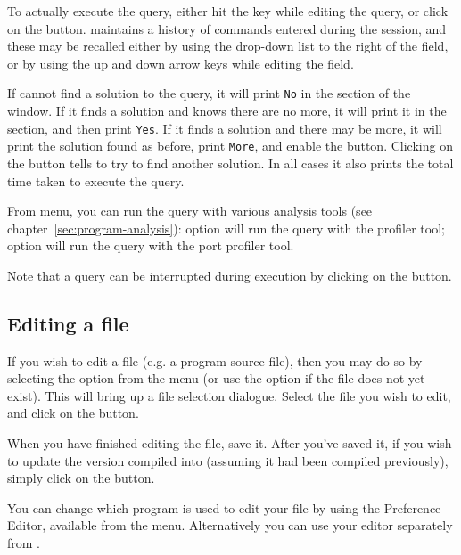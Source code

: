 To actually execute the query, either hit the  key
while editing the query, or click on the  button.
{\tkeclipse} maintains a history of commands entered during the
session, and these may be recalled either by using the drop-down list
to the right of the  field, or by using the up
and down arrow keys while editing the  field.

If {\eclipse} cannot find a solution to the query, it will print
\texttt{No} in the  section of the {\tkeclipse}
window.  If it finds a solution and knows there are no more, it will
print it in the  section, and then print
\texttt{Yes}.  If it finds a solution and there may be more, it will
print the solution found as before, print \texttt{More}, and enable
the  button.  Clicking on the  button
tells {\eclipse} to try to find another solution.  In all cases it
also prints the total time taken to execute the query.

From  menu, you can run the query with various analysis tools
(see chapter~\ref{sec:program-analysis}):  option
will run the query with the profiler tool;  option
will run the query with the port profiler tool. 

Note that a query can be interrupted during execution by clicking on
the  button.

\subsection{Editing a file}
\label{secedit}

If you wish to edit a file (e.g. a program source file), then you may
do so by selecting the  option from the
 menu (or use the  option if the file
does not yet exist).  This will bring up a file selection dialogue.
Select the file you wish to edit, and click on the 
button.

When you have finished editing the file, save it.  After you've saved
it, if you wish to update the version compiled into {\eclipse}
(assuming it had been compiled previously), simply click on the
 button.

You can change which program is used to edit your file by using the
{\tkeclipse} Preference Editor, available from the 
menu.  Alternatively you can use your editor separately from
\eclipse{}.

